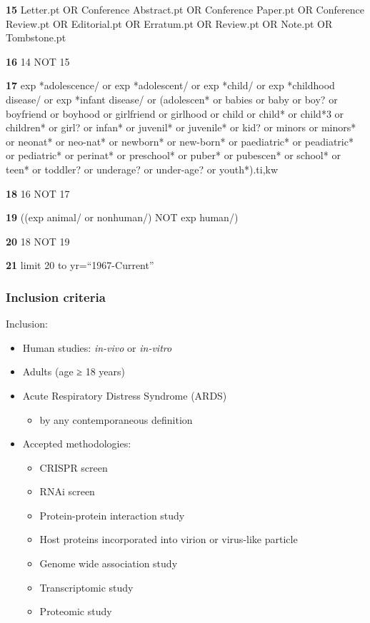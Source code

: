 \documentclass[
  11,
  a4paper,
]{article}
\providecommand{\tightlist}{%
  \setlength{\itemsep}{0pt}\setlength{\parskip}{0pt}}\usepackage{longtable,booktabs,array}
\begin{document}
\textbf{15} Letter.pt OR Conference Abstract.pt OR Conference Paper.pt
OR Conference Review.pt OR Editorial.pt OR Erratum.pt OR Review.pt OR
Note.pt OR Tombstone.pt

\textbf{16} 14 NOT 15

\textbf{17} exp *adolescence/ or exp *adolescent/ or exp *child/ or exp
*childhood disease/ or exp *infant disease/ or (adolescen* or babies or
baby or boy? or boyfriend or boyhood or girlfriend or girlhood or child
or child* or child*3 or children* or girl? or infan* or juvenil* or
juvenile* or kid? or minors or minors* or neonat* or neo-nat* or
newborn* or new-born* or paediatric* or peadiatric* or pediatric* or
perinat* or preschool* or puber* or pubescen* or school* or teen* or
toddler? or underage? or under-age? or youth*).ti,kw

\textbf{18} 16 NOT 17

\textbf{19} ((exp animal/ or nonhuman/) NOT exp human/)

\textbf{20} 18 NOT 19

\textbf{21} limit 20 to yr=``1967-Current''

\newpage

\subsubsection{Inclusion criteria}\label{inclusion-criteria}

Inclusion:

\begin{itemize}
\tightlist
\item
  Human studies: \emph{in-vivo} or \emph{in-vitro}
\item
  Adults (age ≥ 18 years)
\item
  Acute Respiratory Distress Syndrome (ARDS)

  \begin{itemize}
  \tightlist
  \item
    by any contemporaneous definition
  \end{itemize}
\item
  Accepted methodologies:

  \begin{itemize}
  \tightlist
  \item
    CRISPR screen
  \item
    RNAi screen
  \item
    Protein-protein interaction study
  \item
    Host proteins incorporated into virion or virus-like particle
  \item
    Genome wide association study
  \item
    Transcriptomic study
  \item
    Proteomic study
  \end{itemize}
\end{itemize}
\end{document}
